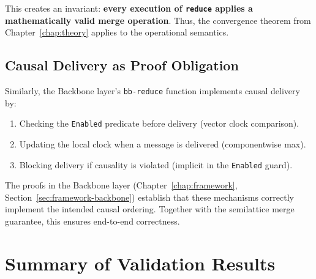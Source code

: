 This creates an invariant: \textbf{every execution of \texttt{reduce} applies a mathematically valid merge operation}. Thus, the convergence theorem from Chapter~\ref{chap:theory} applies to the operational semantics.

\subsection{Causal Delivery as Proof Obligation}

Similarly, the Backbone layer's \texttt{bb-reduce} function implements causal delivery by:

\begin{enumerate}
  \item Checking the \texttt{Enabled} predicate before delivery (vector clock comparison).
  \item Updating the local clock when a message is delivered (componentwise max).
  \item Blocking delivery if causality is violated (implicit in the \texttt{Enabled} guard).
\end{enumerate}

The proofs in the Backbone layer (Chapter~\ref{chap:framework}, Section~\ref{sec:framework-backbone}) establish that these mechanisms correctly implement the intended causal ordering. Together with the semilattice merge guarantee, this ensures end-to-end correctness.

\section{Summary of Validation Results}

